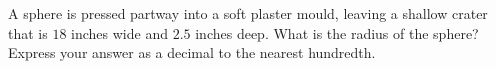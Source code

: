 A sphere is pressed partway into a soft plaster mould, leaving a shallow crater that is $18$ inches wide and $2.5$ inches deep. What is the radius of the sphere? Express your answer as a decimal to the nearest hundredth.
